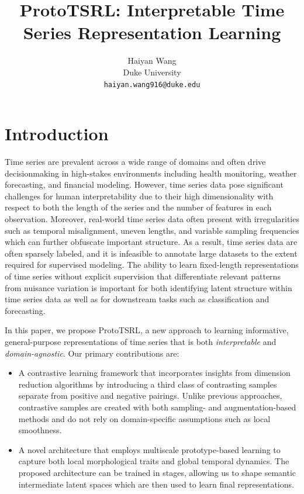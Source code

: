 \documentclass{article}
\title{ProtoTSRL: Interpretable Time Series Representation Learning}
\author{
    Haiyan Wang \\
    Duke University \\
    \texttt{haiyan.wang916@duke.edu}
}
\begin{document}
\maketitle

\begin{abstract}
\end{abstract}



\section{Introduction}
\label{sec:intro}

Time series are prevalent across a wide range of domains and often drive decisionmaking in high-stakes environments including health monitoring, weather forecasting, and financial modeling. However, time series data pose significant challenges for human interpretability due to their high dimensionality with respect to both the length of the series and the number of features in each observation. Moreover, real-world time series data often present with irregularities such as temporal misalignment, uneven lengths, and variable sampling frequencies which can further obfuscate important structure. As a result, time series data are often sparsely labeled, and it is infeasible to annotate large datasets to the extent required for supervised modeling. The ability to learn fixed-length representations of time series without explicit supervision that differentiate relevant patterns from nuisance variation is important for both identifying latent structure within time series data as well as for downstream tasks such as classification and forecasting. 

In this paper, we propose ProtoTSRL, a new approach to learning informative, general-purpose representations of time series that is both \textit{interpretable} and \textit{domain-agnostic}. Our primary contributions are: 
\begin{itemize}
    \item A contrastive learning framework that incorporates insights from dimension reduction algorithms by introducing a third class of contrasting samples separate from positive and negative pairings. Unlike previous approaches, contrastive samples are created with both sampling- and augmentation-based methods and do not rely on domain-specific assumptions such as local smoothness.
    \item A novel architecture that employs multiscale prototype-based learning to capture both local morphological traits and global temporal dynamics. The proposed architecture can be trained in stages, allowing us to shape semantic intermediate latent spaces which are then used to learn final representations.
\end{itemize}
\end{document}
